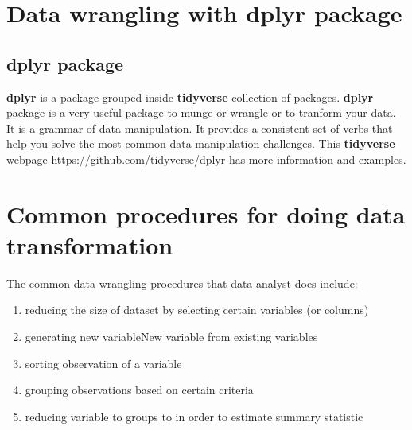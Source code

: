 \documentclass[
  10pt,
]{krantz}
\providecommand{\tightlist}{%
  \setlength{\itemsep}{0pt}\setlength{\parskip}{0pt}}
\begin{document}
\hypertarget{data-wrangling-with-dplyr-package}{%
\section{\texorpdfstring{Data wrangling with \textbf{dplyr} package}{Data wrangling with dplyr package}}\label{data-wrangling-with-dplyr-package}}

\hypertarget{dplyr-package}{%
\subsection{\texorpdfstring{\textbf{dplyr} package}{dplyr package}}\label{dplyr-package}}

\textbf{dplyr} is a package grouped inside \textbf{tidyverse} collection of packages. \textbf{dplyr} package is a very useful package to munge or wrangle or to tranform your data. It is a grammar of data manipulation. It provides a consistent set of verbs that help you solve the most common data manipulation challenges. This \textbf{tidyverse} webpage \url{https://github.com/tidyverse/dplyr} has more information and examples.

\hypertarget{common-procedures-for-doing-data-transformation}{%
\section{\texorpdfstring{Common procedures for doing data transformation}{Common procedures for doing data transformation}}\label{common-procedures-for-doing-data-transformation}}

The common data wrangling procedures that data analyst does include:

\begin{enumerate}
\def\labelenumi{\arabic{enumi}.}
\tightlist
\item
  reducing the size of dataset by selecting certain variables (or columns)
\item
  generating new variableNew variable from existing variables
\item
  sorting observation of a variable
\item
  grouping observations based on certain criteria
\item
  reducing variable to groups to in order to estimate summary statistic
\end{enumerate}
\end{document}
